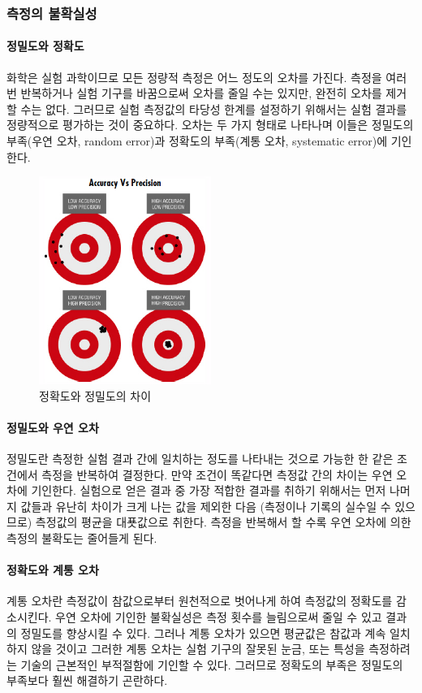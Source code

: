 \documentclass{GSHS-chemexp}
\begin{document}
	\subsubsection{측정의 불확실성}
	
	\paragraph{정밀도와 정확도}
	화학은 실험 과학이므로 모든 정량적 측정은
	어느 정도의 오차를 가진다.
	측정을 여러 번 반복하거나 실험 기구를 바꿈으로써
	오차를 줄일 수는 있지만, 완전히 오차를 제거할 수는 없다.
	그러므로 실험 측정값의 타당성 한계를 설정하기 위해서는
	실험 결과를 정량적으로 평가하는 것이 중요하다.
	오차는 두 가지 형태로 나타나며 이들은
	정밀도의 부족(우연 오차, random error)과
	정확도의 부족(계통 오차, systematic error)에 기인한다.
	\begin{figure}[H]
		\centering
		\includegraphics[width=0.5\textwidth]{Accuracy_Precision.jpg}
		\caption{정확도와 정밀도의 차이}
		\label{fig:acc_pre}
	\end{figure}
		
	\paragraph{정밀도와 우연 오차}
	정밀도란 측정한 실험 결과 간에 일치하는 정도를 나타내는 것으로
	가능한 한 같은 조건에서 측정을 반복하여 결정한다.
	만약 조건이 똑같다면 측정값 간의 차이는 우연 오차에 기인한다.
	실험으로 얻은 결과 중 가장 적합한 결과를 취하기 위해서는
	먼저 나머지 값들과 유난히 차이가 크게 나는 값을 제외한 다음
	(측정이나 기록의 실수일 수 있으므로)
	측정값의 평균을 대푯값으로 취한다.
	측정을 반복해서 할 수록 우연 오차에 의한 측정의 불확도는 줄어들게 된다.
		
	\paragraph{정확도와 계통 오차}
	계통 오차란 측정값이 참값으로부터 원천적으로 벗어나게 하여
	측정값의 정확도를 감소시킨다.
	우연 오차에 기인한 불확실성은 측정 횟수를 늘림으로써
	줄일 수 있고 결과의 정밀도를 향상시킬 수 있다.
	그러나 계통 오차가 있으면 평균값은 참값과
	계속 일치하지 않을 것이고 그러한 계통 오차는
	실험 기구의 잘못된 눈금, 또는 특성을 측정하려는 기술의
	근본적인 부적절함에 기인할 수 있다.
	그러므로 정확도의 부족은 정밀도의 부족보다 훨씬 해결하기 곤란하다.
	
\end{document}
